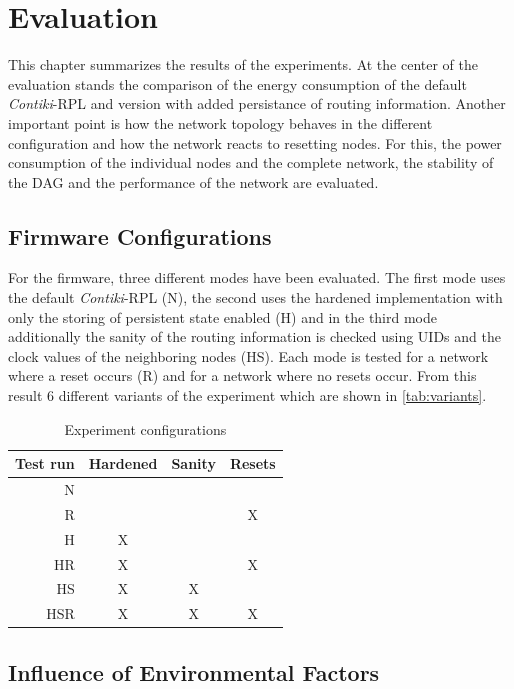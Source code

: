 \chapter{Evaluation} %
\label{chap:evaluation}

This chapter summarizes the results of the experiments. At the center of the
evaluation stands the comparison of the energy consumption of the default
\emph{Contiki}-\ac{RPL} and version with added persistance of routing
information. Another important point is how the network topology behaves in the
different configuration and how the network reacts to resetting nodes. For this,
the power consumption of the individual nodes and the complete network, the stability
of the \ac{DAG} and the performance of the network are evaluated.

\section{Firmware Configurations}
\label{sec:confs}

For the firmware, three different modes have been evaluated. The first mode uses
the default \emph{Contiki}-\ac{RPL} (N), the second uses the hardened implementation with
only the storing of persistent state enabled (H) and in the third mode additionally
the sanity of the routing information is checked using \acp{UID} and the clock
values of the neighboring nodes (HS). Each mode is tested for a network where a
reset occurs (R) and for a network where no resets occur. From this result 6
different variants of the experiment which are shown in \autoref{tab:variants}.

\begin{table}[h]
  \centering
  \caption{Experiment configurations}
  \begin{tabular}{r c c c}
    \toprule
    Test run & Hardened & Sanity & Resets \\
    \midrule
    N   &   &   &   \\
    R   &   &   & X \\
    H   & X &   &   \\
    HR  & X &   & X \\
    HS  & X & X &   \\
    HSR & X & X & X \\
    \end{tabular}
  \label{tab:variants}
\end{table}

\section{Influence of Environmental Factors}

